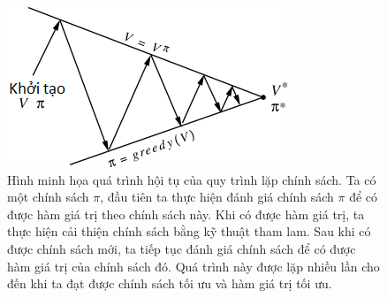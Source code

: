 \begin{figure}
	\centering
	\includegraphics[width=.8\textwidth]{policy_iteration}
	\caption[Hội tụ của quy trình tìm kiếm chính sách tối ưu]{Hình minh họa quá trình hội tụ của quy trình lặp chính sách.
	Ta có một chính sách $\pi$, đầu tiên ta thực hiện đánh giá chính sách $\pi$ để có được hàm giá trị theo chính sách này. 
	Khi có được hàm giá trị, ta thực hiện cải thiện chính sách bằng kỹ thuật tham lam. 
	Sau khi có được chính sách mới, ta tiếp tục đánh giá chính sách để có được hàm giá trị của chính sách đó. 
	Quá trình này được lặp nhiều lần cho đến khi ta đạt được chính sách tối ưu và hàm giá trị tối ưu.}
	\label{fig:policy_iteration_MDP}	
\end{figure}

